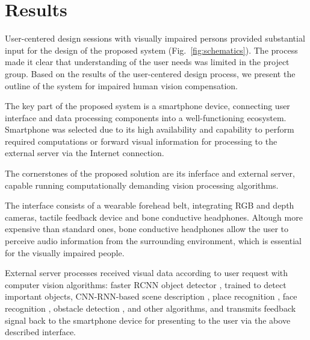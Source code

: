 \documentclass[10pt,conference,compsocconf]{IEEEtran}
\begin{document}
\section{Results}
\label{sec:results}

User-centered design sessions with visually impaired persons provided substantial input for the design of the proposed system (Fig.~\ref{fig:schematics}). The process made it clear that understanding of the user needs was limited in the project group. Based on the results of the user-centered design process, we present the outline of the system for impaired human vision compensation. 

The key part of the proposed system is a smartphone device, connecting user interface and data processing components into a well-functioning ecosystem. Smartphone was selected due to its high availability and capability to perform required computations or forward visual information for processing to the external server via the Internet connection.

The cornerstones of the proposed solution are its inferface and external server, capable running computationally demanding vision processing algorithms.

The interface consists of a wearable forehead belt, integrating RGB and depth cameras, tactile feedback device and bone conductive headphones. Altough more expensive than standard ones, bone conductive headphones allow the user to perceive audio information from the surrounding environment, which is essential for the visually impaired people.

External server processes received visual data according to user request with computer vision algorithms: faster RCNN object detector \cite{Ren}, trained to detect important objects, CNN-RNN-based scene description \cite{Liu}, place recognition \cite{Ohn-Bar}, face recognition \cite{Amos}, obstacle detection \cite{Laina}, and other algorithms, and transmits feedback signal back to the smartphone device for presenting to the user via the above described interface.
\end{document}
